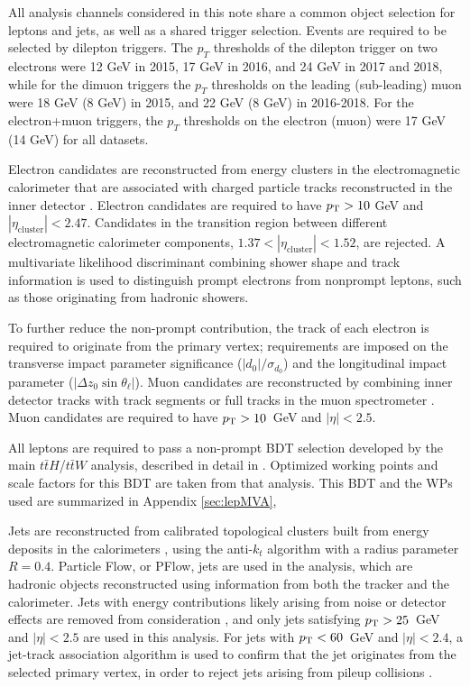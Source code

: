 
All analysis channels considered in this note share a common object selection for leptons and jets, as well as a shared trigger selection. Events are required to be selected by dilepton triggers. The $p_T$ thresholds of the dilepton trigger on two electrons were 12 GeV in 2015, 17 GeV in 2016, and 24 GeV in 2017 and 2018, while for the dimuon triggers the $p_T$ thresholds on the leading (sub-leading) muon were 18 GeV (8 GeV) in 2015, and 22 GeV (8 GeV) in 2016-2018. For the electron+muon triggers, the $p_T$ thresholds on the electron (muon) were 17 GeV (14 GeV) for all datasets.

Electron candidates are reconstructed from energy clusters in the electromagnetic calorimeter that are associated with charged particle tracks reconstructed in the inner detector \cite{ATLAS-CONF-2016-024}.  Electron candidates are required to have $p_{\text{T}} > 10$ GeV and $|\eta_\textrm{cluster}| < 2.47$. Candidates in the transition region between different electromagnetic calorimeter components, $1.37 < |\eta_\textrm{cluster}| < 1.52$, are rejected. A multivariate likelihood discriminant combining shower shape and track information is used to distinguish prompt electrons from nonprompt leptons, such as those originating from hadronic showers. %

To further reduce the non-prompt contribution, the track of each electron is required to originate from the primary vertex; requirements are imposed on the transverse impact parameter significance ($|d_0|/\sigma_{d_0}$) and the longitudinal impact parameter ($|\Delta z_0 \sin \theta_\ell|$). Muon candidates are reconstructed by combining inner detector tracks with track segments or full tracks in the muon spectrometer \cite{PERF-2014-05}. Muon candidates are required to have $p_{\text{T}} > 10$~GeV and $|\eta| < 2.5$. %

All leptons are required to pass a non-prompt BDT selection developed by the main $t\bar{t}H$/$t\bar{t}W$ analysis, described in detail in \cite{ttH_paper}. Optimized working points and scale factors for this BDT are taken from that analysis. This BDT and the WPs used are summarized in Appendix \ref{sec:lepMVA},

Jets are reconstructed from calibrated topological clusters built from energy deposits in the calorimeters \cite{ATL-PHYS-PUB-2015-015}, using the anti-$k_t$ algorithm with a radius parameter $R=0.4$. Particle Flow, or PFlow, jets are used in the analysis, which are hadronic objects reconstructed using information from both the tracker and the calorimeter. Jets with energy contributions likely arising from noise or detector effects are removed from consideration \cite{ATLAS-CONF-2015-029}, and only jets satisfying $p_{\text{T}} > 25$~GeV and $|\eta| < 2.5$ are used in this analysis.  For jets with $p_{\text{T}} < 60$~GeV and $|\eta| < 2.4$, a jet-track association algorithm is used to confirm that the jet originates from the selected primary vertex, in order to reject jets arising from pileup collisions \cite{PERF-2014-03}. 

